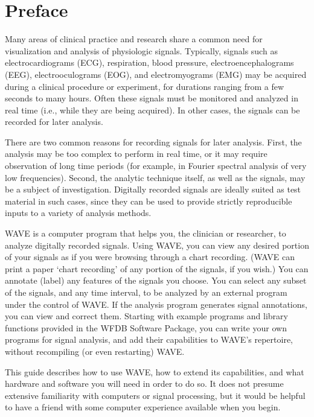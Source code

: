 \documentclass[twoside]{book}
\newcommand{\WAVE}{{\sf WAVE}\xspace}
\begin{document}

\newpage
\pagestyle{plain}
\chapter*{Preface}

Many areas of clinical practice and research share a common need for
visualization and analysis of physiologic signals.  Typically, signals such as
electrocardiograms (ECG), respiration, blood pressure, electroencephalograms
(EEG), electrooculograms (EOG), and electromyograms (EMG) may be acquired
during a clinical procedure or experiment, for durations ranging from a few
seconds to many hours.  Often these signals must be monitored and analyzed in
real time (i.e., while they are being acquired).  In other cases, the signals
can be recorded for later analysis.

There are two common reasons for recording signals for later analysis.  First,
the analysis may be too complex to perform in real time, or it may require
observation of long time periods (for example, in Fourier spectral analysis of
very low frequencies).  Second, the analytic technique itself, as well as the
signals, may be a subject of investigation.  Digitally recorded signals are
ideally suited as test material in such cases, since they can be used to
provide strictly reproducible inputs to a variety of analysis methods.

\WAVE{} is a computer program that helps you, the clinician or researcher,
to analyze digitally recorded signals.  Using \WAVE{}, you can view any
desired portion of your signals as if you were browsing through a chart
recording.  (\WAVE{} can print a paper `chart recording' of any portion of
the signals, if you wish.)  You can annotate (label) any features of the
signals you choose.  You can select any subset of the signals, and any time
interval, to be analyzed by an external program under the control of
\WAVE{}.  If the analysis program generates signal annotations, you can view and
correct them.  Starting with example programs and library functions provided in
the WFDB Software Package, you can write your own programs for signal analysis,
and add their capabilities to \WAVE{}'s repertoire, without recompiling (or
even restarting) \WAVE{}.

This guide describes how to use \WAVE{}, how to extend its capabilities,
and what hardware and software you will need in order to do so. It does not
presume extensive familiarity with computers or signal processing, but it would
be helpful to have a friend with some computer experience available when you
begin.
\end{document}
